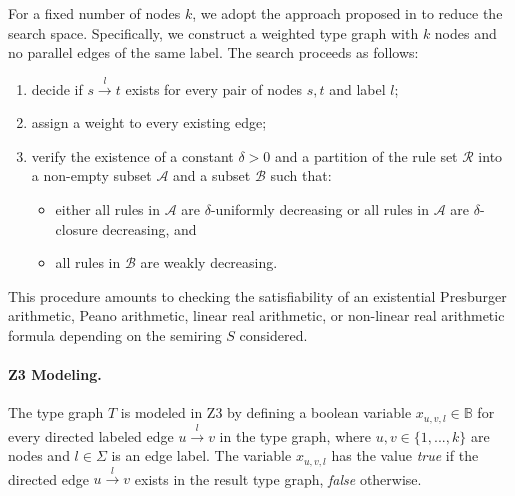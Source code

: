 For a fixed number of nodes $k$, we adopt the approach proposed in \cite{bruggink2015proving, bruggink2014termination,zantema2014termination} to reduce the search space. Specifically, we construct a weighted type graph with
$k$ nodes and no parallel edges of the same label.
The search proceeds as follows: 
\begin{enumerate}
    \item decide if $s \overset{l}{\to} t$ exists for every pair of nodes \( s, t\) and label \( l\);
    \item assign a weight to every existing edge;
    \item verify the existence of a constant $\delta >0$ and a partition of the rule set $\mathcal{R}$ into a non-empty subset $\mathcal{A}$ and a subset $\mathcal{B}$
 such that:
    \begin{itemize}
        \item either all rules in $\mathcal{A}$ are $\delta$-uniformly decreasing or all rules in $\mathcal{A}$ are $\delta$-closure decreasing, and
        \item all rules in $\mathcal{B}$ are weakly decreasing.
    \end{itemize}
\end{enumerate}


This procedure amounts to checking the satisfiability of an existential Presburger arithmetic, Peano arithmetic, linear real arithmetic, or non-linear real arithmetic formula depending on the semiring $S$ considered.

\paragraph{Z3 Modeling.}
The type graph $T$ is modeled in Z3 by defining 
a boolean variable $x_{u,v,l} \in \mathbb{B}$ for every directed labeled edge $u\overset{l}{\to} v$ in the type graph, where $u,v\in\{1,...,k\}$ are nodes and $l \in \Sigma$ is an edge label. 
The variable $x_{u,v,l}$ has the value \textit{true} if the directed edge $u\overset{l}{\to} v$ exists in the result type graph, \textit{false} otherwise. 

